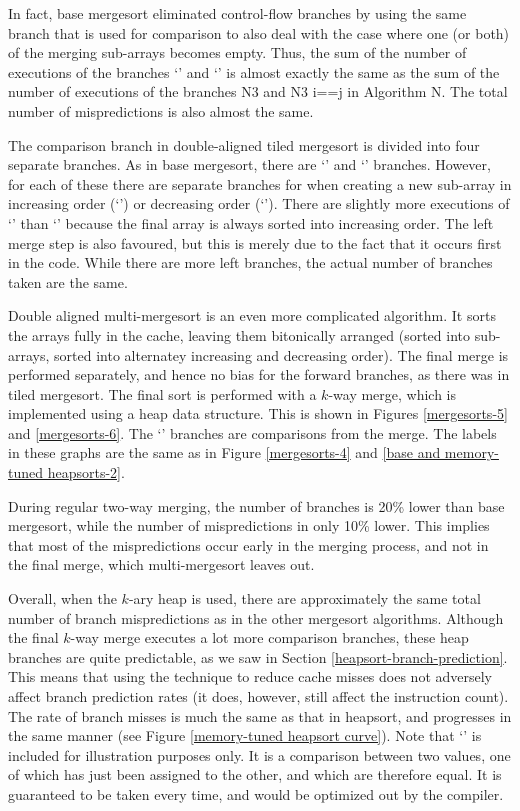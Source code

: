 In fact, base mergesort eliminated control-flow branches by using the same
branch that is used for comparison to also deal with the case where one (or
both) of the merging sub-arrays becomes empty. Thus, the sum of the number of
executions of the branches `' and `' is almost exactly the same
as the sum of the number of executions of the branches N3 and N3 i==j in
Algorithm N. The total number of mispredictions is also almost the same.

The comparison branch in double-aligned tiled mergesort is divided into four
separate branches. As in base mergesort, there are `' and `'
branches. However, for each of these there are separate branches for when
creating a new sub-array in increasing order (`') or decreasing
order (`'). There are slightly more executions of `' than
`' because the final array is always sorted into increasing order.
The left merge step is also favoured, but this is merely due to the fact that it
occurs first in the code. While there are more left branches, the actual number
of branches taken are the same.

Double aligned multi-mergesort is an even more complicated algorithm.  It sorts
the arrays fully in the cache, leaving them bitonically arranged (sorted into
sub-arrays, sorted into alternatey increasing and decreasing order). The final
merge is performed separately, and hence no bias for the forward branches, as
there was in tiled mergesort. The final sort is performed with a $k$-way merge,
which is implemented using a heap data structure. This is shown in Figures
\ref{mergesorts-5} and \ref{mergesorts-6}. The `' branches are
comparisons from the merge. The labels in these graphs are the same as in Figure
\ref{mergesorts-4} and \ref{base and memory-tuned heapsorts-2}.

During regular two-way merging, the number of branches is 20\% lower than base
mergesort, while the number of mispredictions in only 10\% lower. This implies
that most of the mispredictions occur early in the merging process, and not in
the final merge, which multi-mergesort leaves out.

Overall, when the $k$-ary heap is used, there are approximately the same total
number of branch mispredictions as in the other mergesort algorithms. Although
the final $k$-way merge executes a lot more comparison branches, these heap
branches are quite predictable, as we saw in Section
\ref{heapsort-branch-prediction}. This means that using the technique to reduce
cache misses does not adversely affect branch prediction rates (it does,
however, still affect the instruction count).  The rate of branch misses is much
the same as that in heapsort, and progresses in the same manner (see Figure
\ref{memory-tuned heapsort curve}). Note that `' is included for
illustration purposes only. It is a comparison between two values, one of which
has just been assigned to the other, and which are therefore equal. It is
guaranteed to be taken every time, and would be optimized out by the compiler. 


